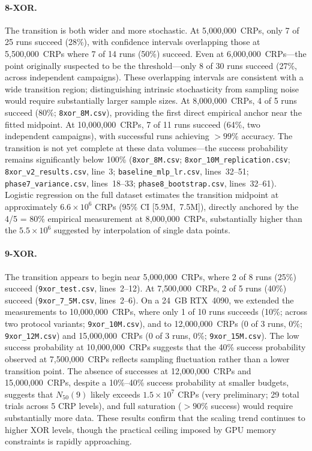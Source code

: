 \paragraph{8-XOR.}
The transition is both wider and more stochastic.  At 5{,}000{,}000~CRPs,
only 7 of 25 runs succeed (28\%), with confidence intervals overlapping those
at 5{,}500{,}000~CRPs where 7 of 14 runs (50\%) succeed.  Even at
6{,}000{,}000~CRPs---the point originally suspected to be the
threshold---only 8 of 30 runs succeed (27\%, across independent campaigns).  These overlapping intervals are consistent with a wide
transition region; distinguishing intrinsic stochasticity from sampling
noise would require substantially larger sample sizes.  At
8{,}000{,}000~CRPs, 4 of 5 runs succeed (80\%; \texttt{8xor\_8M.csv}),
providing the first direct empirical anchor near the fitted midpoint.  At
10{,}000{,}000~CRPs, 7 of 11
runs succeed (64\%, two independent campaigns), with successful runs
achieving $>99\%$ accuracy.
The transition is not yet complete at these data volumes---the success
probability remains significantly below 100\%
(\texttt{8xor\_8M.csv};
\texttt{8xor\_10M\_replication.csv};
\texttt{8xor\_v2\_results.csv}, line~3; \texttt{baseline\_mlp\_lr.csv},
lines~32--51; \texttt{phase7\_variance.csv}, lines~18--33;
\texttt{phase8\_bootstrap.csv}, lines~32--61).
Logistic regression on the full dataset estimates the transition midpoint
at approximately $6.6\times10^6$ CRPs (95\% CI [5.9M,~7.5M]),
directly anchored by the 4/5 = 80\% empirical measurement at
8{,}000{,}000~CRPs, substantially higher than the $5.5\times10^6$ suggested
by interpolation of single data points.

\paragraph{9-XOR.}
The transition appears to begin near 5{,}000{,}000~CRPs, where 2 of 8 runs
(25\%) succeed (\texttt{9xor\_test.csv}, lines~2--12).  At 7{,}500{,}000~CRPs,
2 of 5 runs (40\%) succeed (\texttt{9xor\_7\_5M.csv}, lines~2--6).  On a
24~GB RTX~4090, we extended the measurements to 10{,}000{,}000~CRPs, where
only 1 of 10 runs succeeds (10\%; across two protocol variants;
\texttt{9xor\_10M.csv}), and to 12{,}000{,}000~CRPs (0 of 3 runs, 0\%;
\texttt{9xor\_12M.csv}) and 15{,}000{,}000~CRPs (0 of 3 runs, 0\%;
\texttt{9xor\_15M.csv}).  The low success probability at 10{,}000{,}000~CRPs
suggests that the 40\% success probability observed at 7{,}500{,}000~CRPs reflects
sampling fluctuation rather than a lower transition point.  The absence of
successes at 12{,}000{,}000~CRPs and 15{,}000{,}000~CRPs, despite a 10\%--40\%
success probability at smaller budgets, suggests that $N_{50}(9)$ likely exceeds
$1.5\times10^7$ CRPs (very preliminary; 29 total trials across 5 CRP
levels), and full saturation ($>90\%$ success) would require substantially
more data.  These results confirm that the scaling trend
continues to higher XOR levels, though the practical ceiling imposed by GPU
memory constraints is rapidly approaching.

